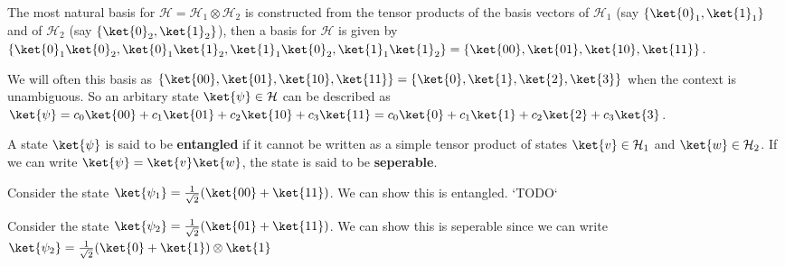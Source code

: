 The most natural basis for $\mathcal{H} = \mathcal{H}_1 \otimes \mathcal{H}_2$ is constructed from the tensor products of the basis vectors of $\mathcal{H}_1$ (say $\{ \ket{0}_1, \ket{1}_1 \}$ and of $\mathcal{H}_2$ (say $\{ \ket{0}_2, \ket{1}_2 \}$), then a basis for $\mathcal{H}$ is given by $\{ \ket{0}_1\ket{0}_2, \ket{0}_1\ket{1}_2, \ket{1}_1\ket{0}_2, \ket{1}_1\ket{1}_2 \} \\ = \{ \ket{00}, \ket{01}, \ket{10}, \ket{11} \}$.

We will often this basis as $\{ \ket{00}, \ket{01}, \ket{10}, \ket{11} \} = \{ \ket{0}, \ket{1}, \ket{2}, \ket{3} \}$ when the context is unambiguous. So an arbitary state $\ket{\psi} \in \mathcal{H}$ can be described as $\ket{\psi} = c_0 \ket{00} + c_1 \ket{01} + c_2 \ket{10} + c_3 \ket{11} = c_0 \ket{0} + c_1 \ket{1} + c_2 \ket{2} + c_3 \ket{3}$.

\begin{defn}
A state $\ket{\psi}$ is said to be \textbf{entangled} if it cannot be written as a simple tensor product of states $\ket{v} \in \mathcal{H}_1$ and $\ket{w} \in \mathcal{H}_2$. If we can write $\ket{\psi} = \ket{v}\ket{w}$, the state is said to be \textbf{seperable}.
\end{defn}

\begin{eg}
Consider the state $\ket{\psi_1} = \frac{1}{\sqrt{2}} (\ket{00} + \ket{11})$. We can show this is entangled. `TODO`
\end{eg}

\begin{eg}
Consider the state $\ket{\psi_2} = \frac{1}{\sqrt{2}} (\ket{01} + \ket{11})$. We can show this is seperable since we can write $\ket{\psi_2} = \frac{1}{\sqrt{2}} (\ket{0} + \ket{1}) \otimes \ket{1}$
\end{eg}

